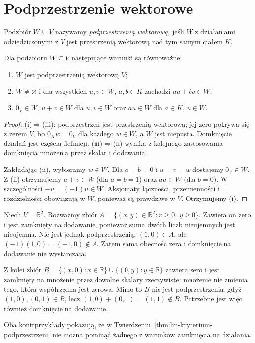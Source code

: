 \section{Podprzestrzenie wektorowe}
\label{sec:lin-podprzestrzenie}

\begin{definicja}[Podprzestrzeń]
\label{def:lin-podprzestrzen}
Podzbiór \(W\subseteq V\) nazywamy \emph{podprzestrzenią wektorową},
jeśli \(W\) z działaniami odziedziczonymi z \(V\)
jest przestrzenią wektorową nad tym samym ciałem \(K\).
\end{definicja}

\begin{twierdzenie}
\label{thm:lin-kryterium-podprzestrzeni}
Dla podzbioru \(W\subseteq V\) następujące warunki są równoważne:
\begin{enumerate}[label=(\roman*)]
\item \(W\) jest podprzestrzenią wektorową \(V\);
\item \(W\neq\varnothing\) i dla wszystkich \(u,v\in W\),
      \(a,b\in K\) zachodzi \(au+bv\in W\);
\item \(0_V\in W\), \(u+v\in W\) dla \(u,v\in W\)
      oraz \(au\in W\) dla \(a\in K\), \(u\in W\).
\end{enumerate}
\end{twierdzenie}
\begin{proof}
(i)\(\Rightarrow\)(iii): podprzestrzeń jest przestrzenią
wektorową; jej zero pokrywa się z zerem \(V\),
bo \(0_Kw=0_V\) dla każdego \(w\in W\), a \(W\) jest niepusta.
Domknięcie działań jest częścią definicji.
(iii)\(\Rightarrow\)(ii) wynika z kolejnego zastosowania
domknięcia mnożenia przez skalar i dodawania.

Zakładając (ii), wybieramy \(w\in W\).
Dla \(a=b=0\) i \(u=v=w\) dostajemy \(0_V\in W\).
Z (ii) otrzymujemy \(u+v\in W\) (dla \(a=b=1\))
oraz \(au\in W\) (dla \(b=0\)).
W szczególności \(-u=(-1)u\in W\).
Aksjomaty łączności, przemienności i rozdzielności
obowiązują w \(W\), ponieważ są prawdziwe w \(V\).
Otrzymujemy (i).
\end{proof}

\begin{przyklad}
\label{prz:lin-podprzestrzen-warunki}
Niech \(V=\mathbb R^2\).
Rozważmy zbiór \(A=\{(x,y)\in\mathbb R^2:
x\geq0,\ y\geq0\}\).
Zawiera on zero i jest zamknięty na dodawanie,
ponieważ suma dwóch liczb nieujemnych jest nieujemna.
Nie jest jednak podprzestrzenią:
\((1,0)\in A\), ale \((-1)(1,0)=(-1,0)\notin A\).
Zatem sama obecność zera i domknięcie na dodawanie
nie wystarczają.

Z kolei zbiór
\(B=\{(x,0):x\in\mathbb R\}
\cup\{(0,y):y\in\mathbb R\}\)
zawiera zero i jest zamknięty na mnożenie
przez dowolne skalary rzeczywiste:
mnożenie nie zmienia tego, która współrzędna
jest zerowa. Mimo to \(B\) nie jest
podprzestrzenią, gdyż
\((1,0),(0,1)\in B\), lecz
\((1,0)+(0,1)=(1,1)\notin B\).
Potrzebne jest więc również domknięcie na dodawanie.

Oba kontrprzykłady pokazują, że w
Twierdzeniu~\ref{thm:lin-kryterium-podprzestrzeni}
nie można pominąć żadnego z warunków
zamknięcia na działania.
\end{przyklad}


